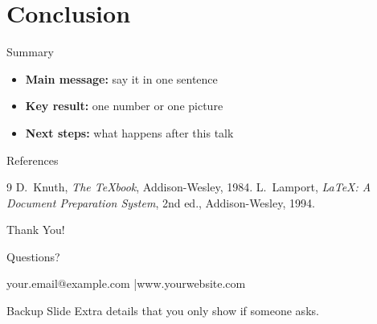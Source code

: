 \documentclass[aspectratio=169, 10pt]{beamer}
\begin{document}
\section{Conclusion}

\begin{frame}{Summary}
  \begin{itemize}
    \item \textbf{Main message:} say it in one sentence~\cite{temp2}
    \item \textbf{Key result:} one number or one picture
    \item \textbf{Next steps:} what happens after this talk
  \end{itemize}
\end{frame}

\begin{frame}[allowframebreaks]{References}
  {%
    \begin{thebibliography}{9}
       D.~Knuth, \emph{The TeXbook}, Addison-Wesley, 1984.
       L.~Lamport, \emph{LaTeX: A Document Preparation System}, 2nd ed., Addison-Wesley, 1994.
    \end{thebibliography}
  }%
\end{frame}

\begin{frame}[plain]
  \centering
  \vfill
  { Thank You!\par}
  \vspace{1em}
  Questions?
  \vspace{1.5em}

  \small
  your.email@example.com \quad|\quad www.yourwebsite.com
  \vfill
\end{frame}

\appendix
\begin{frame}{Backup Slide}
  Extra details that you only show if someone asks.
\end{frame}
\end{document}
